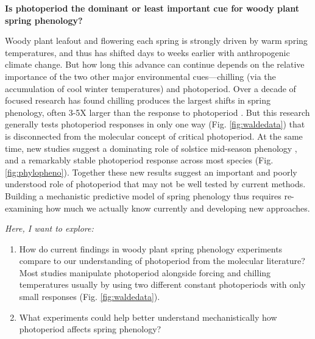 \documentclass[11pt]{article}
\begin{document}
\renewcommand{\refname}{\CHead{}}

{\bf Is photoperiod the dominant or least important cue for woody plant spring phenology?} %


Woody plant leafout and flowering each spring is strongly driven by warm spring temperatures, and thus has shifted days to weeks earlier with anthropogenic climate change. But how long this advance can continue depends on the relative importance of the two other major environmental cues---chilling (via the accumulation of cool winter temperatures) and photoperiod. Over a decade of focused research \citep[e.g.,][]{laube2014gcb,ospreebbms} has found chilling produces the largest shifts in spring phenology, often 3-5X larger than the response to photoperiod \citep{morales2024phylogenetic}. But this research generally tests photoperiod responses in only one way (Fig. \ref{fig:waldedata}) that is disconnected from the molecular concept of critical photoperiod. At the same time, new studies suggest a dominating role of solstice mid-season phenology \citep{zohner2023effect,Journe2024}, and a remarkably stable photoperiod response across most species (Fig. \ref{fig:phylopheno}). Together these new results suggest an important and poorly understood role of photoperiod that may not be well tested by current methods.  Building a mechanistic predictive model of spring phenology thus requires re-examining how much we actually know currently and developing new approaches. 

\emph{Here, I want to explore:}
\begin{enumerate}
\item How do current findings in woody plant spring phenology experiments compare to our understanding of photoperiod from the molecular literature? Most studies manipulate photoperiod alongside forcing and chilling temperatures usually by using two different constant photoperiods with only small responses (Fig. \ref{fig:waldedata}). 
\item What experiments could help better understand mechanistically how photoperiod affects spring phenology?
\end{enumerate}
\end{document}
